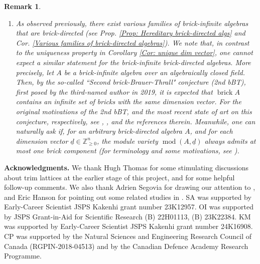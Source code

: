 \documentclass{amsart}
\theoremstyle{thmstyle}
\theoremstyle{exstyle}
\theoremstyle{defstyle}
\theoremstyle{remstyle}
\newtheorem{remark}[thm]{Remark}
\theoremstyle{remstyle}
\DeclareMathOperator*{\modu}{mod}
\DeclareMathOperator*{\brick}{brick}
\begin{document}
\begin{remark}
\begin{enumerate}
\item As observed previously, there exist various families of brick-infinite algebras that are brick-directed (see Prop. \ref{Prop: Hereditary brick-directed algs} and Cor. \ref{Various families of brick-directed algebras}). We note that, in contrast to the uniqueness property in Corollary \ref{Cor: unique dim vector}, one cannot expect a similar statement for the brick-infinite brick-directed algebras. 
More precisely, let $A$ be a brick-infinite algebra over an algebraically closed field. Then, by the so-called ``Second brick-Brauer-Thrall" conjecture (2nd bBT), first posed by the third-named author in 2019, it is expected that $\brick A$ contains an infinite set of bricks with the same dimension vector. For the original motivations of the 2nd bBT, and the most recent state of art on this conjecture, respectively, see \cite{Mo2, Mo3}, \cite{MP2, MP3}, and the references therein. Meanwhile, one can naturally ask if, for an arbitrary brick-directed algebra $A$, and for each dimension vector $\underline{d} \in \mathbb{Z}^n_{\geq 0}$, the module variety $\modu (A,\underline{d})$ always admits at most one brick component (for terminology and some motivations, see \cite{MP1, MP4}).
\end{enumerate}
\end{remark}

\newpage

\textbf{Acknowledgments.} We thank Hugh Thomas for some stimulating discussions about trim lattices at the earlier stage of this project, and for some helpful follow-up comments. We also thank Adrien Segovia for drawing our attention to \cite[Theorem 3.2]{Mu}, and Eric Hanson for pointing out some related studies in \cite[Section 5]{BH}. 
SA was supported by Early-Career Scientist JSPS Kakenhi grant number 23K12957. 
OI was supported by JSPS Grant-in-Aid for Scientific Research (B) 22H01113, (B) 23K22384.
KM was supported by Early-Career Scientist JSPS Kakenhi grant number 24K16908. CP was supported by the Natural Sciences and Engineering Research Council of Canada (RGPIN-2018-04513) and by the Canadian Defence Academy Research Programme. 
\end{document}
